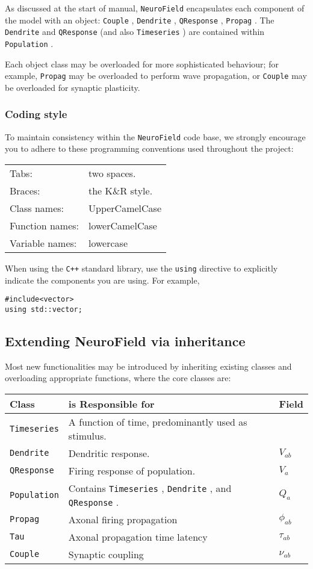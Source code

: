 \documentclass[12pt,a4paper]{article}
\newcommand{\type}[1]{ {\small\small\tt #1} }
\newcommand{\NF}[0]{ \type{NeuroField}}
\begin{document}
As discussed at the start of manual, \NF encapsulates each component of the model with an object: \type{Couple}, \type{Dendrite}, \type{QResponse}, \type{Propag}. The \type{Dendrite} and \type{QResponse} (and also \type{Timeseries}) are contained within \type{Population}.

Each object class may be overloaded for more sophisticated behaviour; for example, \type{Propag} may be overloaded to perform wave propagation, or \type{Couple} may be overloaded for synaptic plasticity.

\subsubsection{Coding style}

To maintain consistency within the \NF code base, we strongly encourage you to adhere to these programming conventions used throughout the project: 

\begin{tabular}{ l l }
	Tabs:& two spaces.\\
	Braces:& the K\&R style.\\
	Class names:&UpperCamelCase\\
	Function names:&lowerCamelCase\\
	Variable names:&lowercase
\end{tabular}

When using the \type{C++} standard library, use the \type{using} directive to explicitly indicate the components you are using. For example,

\begin{lstlisting}
#include<vector>
using std::vector;
\end{lstlisting}

\subsection{Extending NeuroField via inheritance}
\label{sec:extension}

Most new functionalities may be introduced by inheriting existing classes and overloading appropriate functions, where the core classes are:

\begin{tabular}{l l l}
	Class&is Responsible for&Field\\
	\hline
	\type{Timeseries}&A function of time, predominantly used as stimulus.&\\
	\type{Dendrite}&Dendritic response.&$V_{ab}$\\
	\type{QResponse}&Firing response of population.&$V_a$\\
	\type{Population}&Contains \type{Timeseries}, \type{Dendrite}, and \type{QResponse}.&$Q_a$\\
	\type{Propag}&Axonal firing propagation&$\phi_{ab}$\\
	\type{Tau}&Axonal propagation time latency&$\tau_{ab}$\\
	\type{Couple}&Synaptic coupling&$\nu_{ab}$
\end{tabular}
\end{document}
